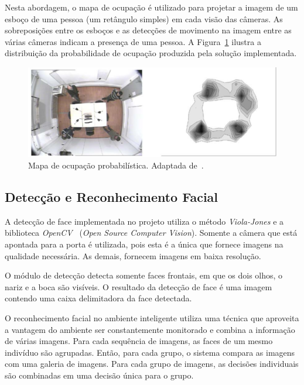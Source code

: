 Nesta abordagem, o mapa de ocupação é utilizado para projetar a imagem de um esboço de uma pessoa (um retângulo simples) em cada visão das câmeras.  As sobreposições entre os esboços e as detecções de movimento na imagem entre as várias câmeras indicam a presença de uma pessoa. A Figura~\ref{fig:pom} ilustra a distribuição da probabilidade de ocupação produzida pela solução implementada.

\begin{figure}[hbt]
		\begin{center}
			\includegraphics[scale=0.5]{figuras/3.TrabalhosCorrelatos/pom.png}
		\end{center}
		\caption{Mapa de ocupação probabilística. Adaptada de~\cite{salah}.}
		\label{fig:pom}
	\end{figure}

\subsection{Detecção e Reconhecimento Facial}

A detecção de face implementada no projeto utiliza o método \textit{Viola-Jones} e a biblioteca \textit{OpenCV}~\cite{opencv_library} (\textit{Open Source Computer Vision}). Somente a câmera que está apontada para a porta é utilizada, pois esta é a única que fornece imagens na qualidade necessária. As demais, fornecem imagens em baixa resolução.  

O módulo de detecção detecta somente faces frontais, em que os dois olhos, o nariz e a boca são visíveis. O resultado da detecção de face é uma imagem contendo uma caixa delimitadora da face detectada.

O reconhecimento facial no ambiente inteligente utiliza uma técnica que aproveita a vantagem do ambiente ser constantemente monitorado e combina a informação de várias imagens. Para cada sequência de imagens, as faces de um mesmo indivíduo são agrupadas. Então, para cada grupo, o sistema compara as imagens com uma galeria de imagens. Para cada grupo de imagens, as decisões individuais são combinadas em uma decisão única para o grupo.

